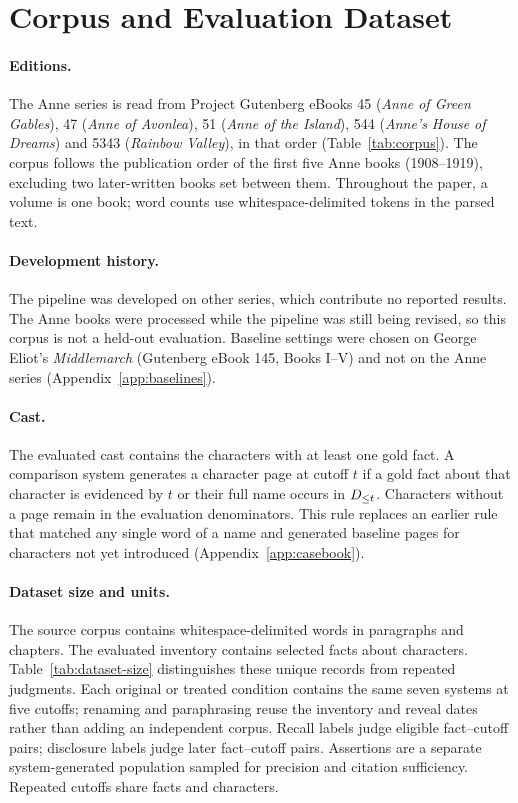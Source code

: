 \section{Corpus and Evaluation Dataset}
\label{app:corpus}



\paragraph{Editions.} The Anne series is read from Project Gutenberg eBooks 45 (\emph{Anne of
Green Gables}), 47 (\emph{Anne of Avonlea}), 51 (\emph{Anne of the Island}), 544 (\emph{Anne's
House of Dreams}) and 5343 (\emph{Rainbow Valley}), in that order (Table~\ref{tab:corpus}).
The corpus follows the publication order of the first five Anne books (1908--1919), excluding
two later-written books set between them. Throughout the paper, a volume is one book; word
counts use whitespace-delimited tokens in the parsed text.

\paragraph{Development history.} The pipeline was developed on other series,
which contribute no reported results. The Anne books were processed while the pipeline was
still being revised, so this corpus is not a held-out evaluation. Baseline settings were chosen on George
Eliot's \emph{Middlemarch} (Gutenberg eBook 145, Books I--V) and not on the Anne series
(Appendix~\ref{app:baselines}).

\paragraph{Cast.} The evaluated cast contains the  characters with at least one
gold fact. A comparison system generates a character page at cutoff $t$ if a gold fact about
that character is evidenced by $t$ or their full name occurs in $D_{\le t}$. Characters without a
page remain in the evaluation denominators. This rule replaces an earlier rule that matched
any single word of a name and generated baseline pages for characters not yet introduced
(Appendix~\ref{app:casebook}).

\paragraph{Dataset size and units.}
The source corpus contains  whitespace-delimited words in
 paragraphs and  chapters. The evaluated inventory
contains  selected facts about  characters.
Table~\ref{tab:dataset-size} distinguishes these unique records from repeated judgments.
Each original or treated condition contains the same seven systems at five cutoffs;
renaming and paraphrasing reuse the inventory and reveal dates rather than adding an
independent corpus. Recall labels judge eligible fact--cutoff pairs; disclosure labels judge
later fact--cutoff pairs. Assertions are a separate system-generated population sampled
for precision and citation sufficiency. Repeated cutoffs share facts and characters.

